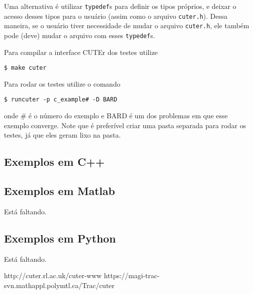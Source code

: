 \documentclass[letterpaper,11pt]{article}
\numberwithin{equation}{section}
\begin{document}
Uma alternativa é utilizar \verb+typedef+s para definir os tipos próprios, e deixar o
acesso desses tipos para o usuário (assim como o arquivo \verb+cuter.h+). Dessa maneira,
se o usuário tiver necessidade de mudar o arquivo \verb+cuter.h+, ele também pode (deve)
mudar o arquivo com esses \verb+typedef+s.

Para compilar a interface CUTEr dos testes utilize
\begin{verbatim}
$ make cuter
\end{verbatim}
Para rodar os testes utilize o comando
\begin{verbatim}
$ runcuter -p c_example# -D BARD
\end{verbatim}
onde \# é o número do exemplo e BARD é um dos problemas em que esse exemplo converge. Note
que é preferível criar uma pasta separada para rodar os testes, já que eles geram lixo na
pasta.



\subsection{Exemplos em C++}

\subsection{Exemplos em Matlab}

Está faltando.

\subsection{Exemplos em Python}

Está faltando.

\begin{thebibliography}{3}
 http://cuter.rl.ac.uk/cuter-www 
 https://magi-trac-svn.mathappl.polymtl.ca/Trac/cuter 
\end{thebibliography}
\end{document}
